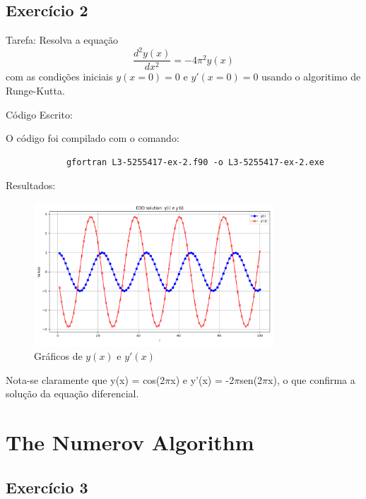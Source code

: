 \documentclass[12pt, a4paper]{article} %
\begin{document}
    \subsection{Exerc\'icio 2}

        Tarefa: Resolva a equa\c{c}\~ao
        \begin{equation*}
            \frac{d^{2}y(x)}{dx^{2}} = -4\pi^{2}y(x)
        \end{equation*}
        com as condi\c{c}\~oes iniciais $y(x=0) = 0$ e $y'(x=0) = 0$ usando o algoritimo de Runge-Kutta.

        C\'odigo Escrito:
        

        O c\'odigo foi compilado com o comando:
        \begin{verbatim}
            gfortran L3-5255417-ex-2.f90 -o L3-5255417-ex-2.exe
        \end{verbatim}

        Resultados:
        \begin{figure}[H]
            \centering
            \includegraphics[width=0.8\textwidth]{../images/results-ex-2.png}
            \caption{Gr\'aficos de $y(x)$ e $y'(x)$}
        \end{figure}

        Nota-se claramente que y(x) = cos(2$\pi$x) e y'(x) = -2$\pi$sen(2$\pi$x), o que confirma a solu\c{c}\~ao da equa\c{c}\~ao diferencial.
        
\section{The Numerov Algorithm}

    \subsection{Exerc\'icio 3}
\end{document}
